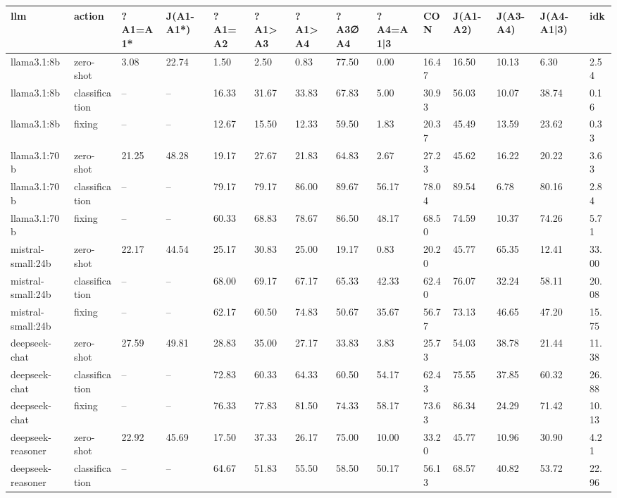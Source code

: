 \begin{table}[!t]
\centering\scriptsize
\begin{tabular}{llllllllllllll}
\toprule
llm & action & ?A1=A1* & J(A1-A1*) & ?A1=A2 & ?A1>A3 & ?A1>A4 & ?A3∅A4 & ?A4=A1|3 & CON & J(A1-A2) & J(A3-A4) & J(A4-A1|3) & idk \\
\midrule
llama3.1:8b & zero-shot & 3.08 & 22.74 & 1.50 & 2.50 & 0.83 & 77.50 & 0.00 & 16.47 & 16.50 & 10.13 & 6.30 & 2.54 \\
llama3.1:8b & classification & -- & -- & 16.33 & 31.67 & 33.83 & 67.83 & 5.00 & 30.93 & 56.03 & 10.07 & 38.74 & 0.16 \\
llama3.1:8b & fixing & -- & -- & 12.67 & 15.50 & 12.33 & 59.50 & 1.83 & 20.37 & 45.49 & 13.59 & 23.62 & 0.33 \\
llama3.1:70b & zero-shot & 21.25 & 48.28 & 19.17 & 27.67 & 21.83 & 64.83 & 2.67 & 27.23 & 45.62 & 16.22 & 20.22 & 3.63 \\
llama3.1:70b & classification & -- & -- & 79.17 & 79.17 & 86.00 & 89.67 & 56.17 & 78.04 & 89.54 & 6.78 & 80.16 & 2.84 \\
llama3.1:70b & fixing & -- & -- & 60.33 & 68.83 & 78.67 & 86.50 & 48.17 & 68.50 & 74.59 & 10.37 & 74.26 & 5.71 \\
mistral-small:24b & zero-shot & 22.17 & 44.54 & 25.17 & 30.83 & 25.00 & 19.17 & 0.83 & 20.20 & 45.77 & 65.35 & 12.41 & 33.00 \\
mistral-small:24b & classification & -- & -- & 68.00 & 69.17 & 67.17 & 65.33 & 42.33 & 62.40 & 76.07 & 32.24 & 58.11 & 20.08 \\
mistral-small:24b & fixing & -- & -- & 62.17 & 60.50 & 74.83 & 50.67 & 35.67 & 56.77 & 73.13 & 46.65 & 47.20 & 15.75 \\
deepseek-chat & zero-shot & 27.59 & 49.81 & 28.83 & 35.00 & 27.17 & 33.83 & 3.83 & 25.73 & 54.03 & 38.78 & 21.44 & 11.38 \\
deepseek-chat & classification & -- & -- & 72.83 & 60.33 & 64.33 & 60.50 & 54.17 & 62.43 & 75.55 & 37.85 & 60.32 & 26.88 \\
deepseek-chat & fixing & -- & -- & 76.33 & 77.83 & 81.50 & 74.33 & 58.17 & 73.63 & 86.34 & 24.29 & 71.42 & 10.13 \\
deepseek-reasoner & zero-shot & 22.92 & 45.69 & 17.50 & 37.33 & 26.17 & 75.00 & 10.00 & 33.20 & 45.77 & 10.96 & 30.90 & 4.21 \\
deepseek-reasoner & classification & -- & -- & 64.67 & 51.83 & 55.50 & 58.50 & 50.17 & 56.13 & 68.57 & 40.82 & 53.72 & 22.96 \\

\end{tabular}
\end{table}
